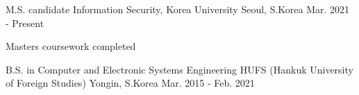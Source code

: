 

\begin{cventries}
  \cventry
    {M.S. candidate} %
    {Information Security, Korea University} %
    {Seoul, S.Korea} %
    {Mar. 2021 - Present} %
    {
      \begin{cvitems} %
        \item {Masters coursework completed}
      \end{cvitems}
    }

  \cventry
    {B.S. in Computer and Electronic Systems Engineering} %
    {HUFS (Hankuk University of Foreign Studies)} %
    {Yongin, S.Korea} %
    {Mar. 2015 - Feb. 2021} %
    {
    }

\end{cventries}
